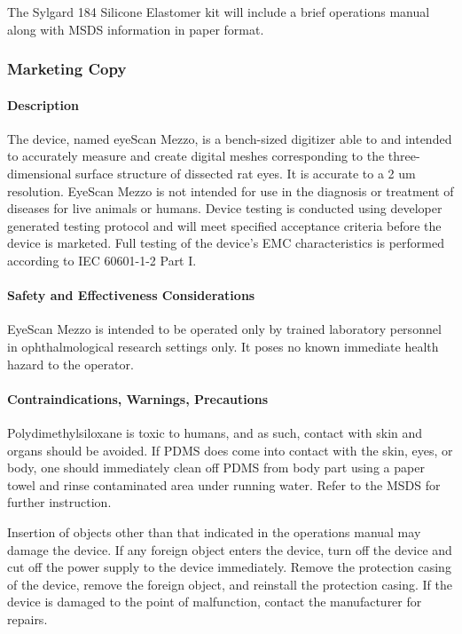 The Sylgard 184 Silicone Elastomer kit will include a brief operations
manual along with MSDS information in paper format.

\subsubsection{Marketing Copy}

\paragraph{Description}
The device, named eyeScan Mezzo, is a bench-sized digitizer able to  and intended to accurately measure and create digital meshes corresponding to the three-dimensional surface structure of dissected rat eyes. It is accurate to a 2 um resolution. EyeScan Mezzo is not intended for use in the diagnosis or treatment of diseases for live animals or humans. Device testing is conducted using developer generated testing protocol and will meet specified acceptance criteria before the device is marketed. Full testing of the device's EMC characteristics is performed according to IEC 60601-1-2 Part I.

\paragraph{Safety and Effectiveness Considerations}

EyeScan Mezzo is intended to be operated only by trained laboratory personnel in ophthalmological research settings only. It poses no known immediate health hazard to the operator. 

\paragraph{Contraindications, Warnings, Precautions}

Polydimethylsiloxane is toxic to humans, and as such, contact with skin and organs should be avoided. If PDMS does come into contact with the skin, eyes, or body, one should immediately clean off PDMS from body part using a paper towel and rinse contaminated area under running water. Refer to the MSDS for further instruction.

Insertion of objects other than that indicated in the operations manual may damage the device.
If any foreign object enters the device, turn off the device and cut off the power supply to the device immediately. Remove the protection casing of the device, remove the foreign object, and reinstall the protection casing. If the device is damaged to the point of malfunction, contact the manufacturer for repairs. 

